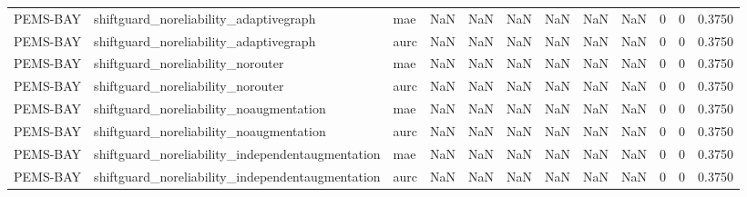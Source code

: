 \begin{tabular}{lllrrrrrrrrr}
PEMS-BAY & shiftguard\_noreliability\_adaptivegraph & mae & NaN & NaN & NaN & NaN & NaN & NaN & 0 & 0 & 0.3750 \\
PEMS-BAY & shiftguard\_noreliability\_adaptivegraph & aurc & NaN & NaN & NaN & NaN & NaN & NaN & 0 & 0 & 0.3750 \\
PEMS-BAY & shiftguard\_noreliability\_norouter & mae & NaN & NaN & NaN & NaN & NaN & NaN & 0 & 0 & 0.3750 \\
PEMS-BAY & shiftguard\_noreliability\_norouter & aurc & NaN & NaN & NaN & NaN & NaN & NaN & 0 & 0 & 0.3750 \\
PEMS-BAY & shiftguard\_noreliability\_noaugmentation & mae & NaN & NaN & NaN & NaN & NaN & NaN & 0 & 0 & 0.3750 \\
PEMS-BAY & shiftguard\_noreliability\_noaugmentation & aurc & NaN & NaN & NaN & NaN & NaN & NaN & 0 & 0 & 0.3750 \\
PEMS-BAY & shiftguard\_noreliability\_independentaugmentation & mae & NaN & NaN & NaN & NaN & NaN & NaN & 0 & 0 & 0.3750 \\
PEMS-BAY & shiftguard\_noreliability\_independentaugmentation & aurc & NaN & NaN & NaN & NaN & NaN & NaN & 0 & 0 & 0.3750 \\
\bottomrule
\end{tabular}
